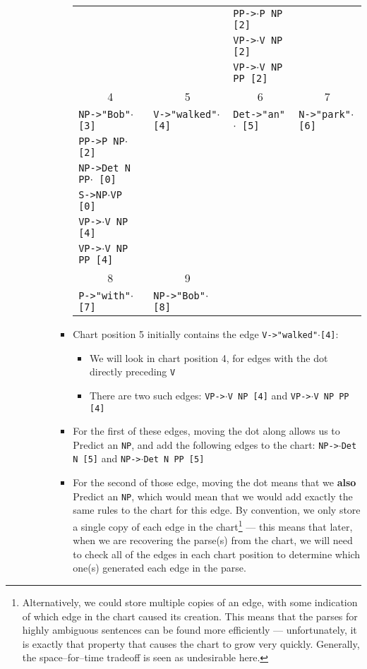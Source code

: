 \documentclass[a4paper]{article}
\begin{document}
\begin{enumerate}
\begin{enumerate}
\begin{enumerate}
\begin{itemize}
\begin{table}[ht]
\begin{tabular}{l|l|l|l}
 & & \texttt{PP->}$\cdot$\texttt{P NP [2]} & \\
 & & \texttt{VP->}$\cdot$\texttt{V NP [2]} & \\
 & & \texttt{VP->}$\cdot$\texttt{V NP PP [2]} & \\
\hline
\multicolumn{1}{c}{4} & \multicolumn{1}{c}{5} & \multicolumn{1}{c}{6} & \multicolumn{1}{c}{7} \\
\hline
\texttt{NP->"Bob"}$\cdot$\texttt{ [3]} & \texttt{V->"walked"}$\cdot$\texttt{ [4]} & \texttt{Det->"an"}$\cdot$\texttt{ [5]} & \texttt{N->"park"}$\cdot$\texttt{ [6]} \\
\texttt{PP->P NP}$\cdot$\texttt{ [2]} & & & \\
\texttt{NP->Det N PP}$\cdot$\texttt{ [0]} & & & \\
\texttt{S->NP}$\cdot$\texttt{VP [0]} & & & \\
\texttt{VP->}$\cdot$\texttt{V NP [4]} & & & \\
\texttt{VP->}$\cdot$\texttt{V NP PP [4]} & & & \\
\hline
\multicolumn{1}{c}{8} & \multicolumn{1}{c}{9} & \multicolumn{1}{c}{} & \\
\hline
\texttt{P->"with"}$\cdot$\texttt{ [7]} & \texttt{NP->"Bob"}$\cdot$\texttt{ [8]} & & \\
\hline
\end{tabular}
\end{table}
\item Chart position 5 initially contains the edge \texttt{V->"walked"}$\cdot$\texttt{[4]}:
\begin{itemize}
\item We will look in chart position 4, for edges with the dot directly preceding \texttt{V}
\item There are two such edges: \texttt{VP->}$\cdot$\texttt{V NP [4]} and \texttt{VP->}$\cdot$\texttt{V NP PP [4]}
\end{itemize}
\item For the first of these edges, moving the dot along allows us to Predict an \texttt{NP}, and add the following edges to the chart: \texttt{NP->}$\cdot$\texttt{Det N [5]} and \texttt{NP->}$\cdot$\texttt{Det N PP [5]}
\item For the second of those edge, moving the dot means that we \textbf{also} Predict an \texttt{NP}, which would mean that we would add exactly the same rules to the chart for this edge. By convention, we only store a single copy of each edge in the chart\footnote{Alternatively, we could store multiple copies of an edge, with some indication of which edge in the chart caused its creation. This means that the parses for highly ambiguous sentences can be found more efficiently --- unfortunately, it is exactly that property that causes the chart to grow very quickly. Generally, the space--for--time tradeoff is seen as undesirable here.} --- this means that later, when we are recovering the parse(s) from the chart, we will need to check all of the edges in each chart position to determine which one(s) generated each edge in the parse.

\end{itemize}
\end{enumerate}
\end{enumerate}
\end{enumerate}
\end{document}
